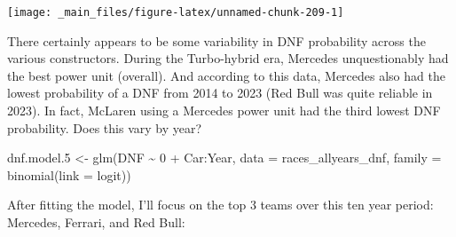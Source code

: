 \documentclass[
]{book}
\newenvironment{Shaded}{\begin{snugshade}}{\end{snugshade}}
\newcommand{\AttributeTok}[1]{\textcolor[rgb]{0.77,0.63,0.00}{#1}}
\newcommand{\DecValTok}[1]{\textcolor[rgb]{0.00,0.00,0.81}{#1}}
\newcommand{\FloatTok}[1]{\textcolor[rgb]{0.00,0.00,0.81}{#1}}
\newcommand{\FunctionTok}[1]{\textcolor[rgb]{0.00,0.00,0.00}{#1}}
\newcommand{\NormalTok}[1]{#1}
\newcommand{\OtherTok}[1]{\textcolor[rgb]{0.56,0.35,0.01}{#1}}
\newcommand{\SpecialCharTok}[1]{\textcolor[rgb]{0.00,0.00,0.00}{#1}}
\newcommand{\StringTok}[1]{\textcolor[rgb]{0.31,0.60,0.02}{#1}}
\begin{document}
\begin{center}\texttt{[image: \_main\_files/figure-latex/unnamed-chunk-209-1]} \end{center}

There certainly appears to be some variability in DNF probability across the various constructors. During the Turbo-hybrid era, Mercedes unquestionably had the best power unit (overall). And according to this data, Mercedes also had the lowest probability of a DNF from 2014 to 2023 (Red Bull was quite reliable in 2023). In fact, McLaren using a Mercedes power unit had the third lowest DNF probability. Does this vary by year?

\begin{Shaded}
\begin{Highlighting}[]
\NormalTok{dnf.model}\FloatTok{.5} \OtherTok{\textless{}{-}} \FunctionTok{glm}\NormalTok{(DNF }\SpecialCharTok{\textasciitilde{}} \DecValTok{0} \SpecialCharTok{+}\NormalTok{ Car}\SpecialCharTok{:}\NormalTok{Year, }\AttributeTok{data =}\NormalTok{ races\_allyears\_dnf,}
                   \AttributeTok{family =} \FunctionTok{binomial}\NormalTok{(}\AttributeTok{link =} \StringTok{\textquotesingle{}logit\textquotesingle{}}\NormalTok{))}
\end{Highlighting}
\end{Shaded}

After fitting the model, I'll focus on the top 3 teams over this ten year period: Mercedes, Ferrari, and Red Bull:
\end{document}
